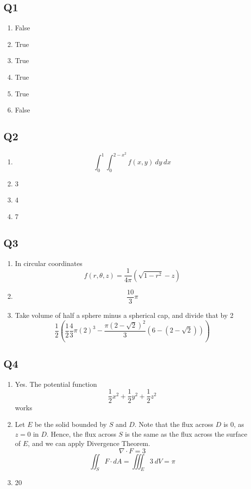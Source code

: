 \documentclass{article}
\newcommand{\paren}[1]{\left(#1\right)}
\begin{document}
\subsection*{Q1}

\begin{enumerate}[label=\alph*.]
\item False
\item True
\item True
\item True
\item True
\item False
\end{enumerate}

\subsection*{Q2}

\begin{enumerate}[label=\alph*.]
\item
\[\int_0^1 \int_0^{2-x^2} f(x,y)\ dy\ dx\]
\item 3
\item 4
\item 7
\end{enumerate}

\subsection*{Q3}

\begin{enumerate}[label=\alph*.]
\item
In circular coordinates
\[f(r,\theta,z) = \frac{1}{4\pi} (\sqrt{1-r^2} - z)\]
\item
\[\frac{10}{3}\pi\]
\item
Take volume of half a sphere minus a spherical cap, and divide that by 2
\[\frac{1}{2}\paren{\frac{1}{2}\frac{4}{3}\pi(2)^3 - \frac{\pi(2-\sqrt{2})^2}{3}(6-(2-\sqrt{2}))}\]
\end{enumerate}

\subsection*{Q4}

\begin{enumerate}[label=\alph*.]
\item Yes. The potential function
\[\frac{1}{2}x^2 + \frac{1}{2}y^2 + \frac{1}{2}z^2\]
works
\item Let $E$ be the solid bounded by $S$ and $D$. Note that the flux across $D$ is $0$, as $z=0$ in $D$. Hence, the flux across $S$ is the same as the flux across the surface of $E$, and we can apply Divergence Theorem.
\[\nabla \cdot F = 3\]
\[\iint_S F\cdot dA = \iiint_E 3\ dV = \pi\]
\item 20
\end{enumerate}
\end{document}
